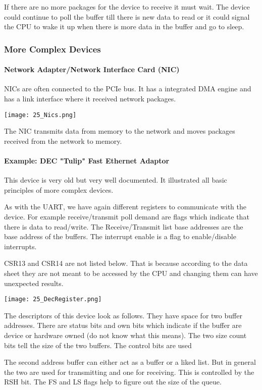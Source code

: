 If there are no more packages for the device to receive it must wait. The device could continue to poll the buffer till there is new data to read or it could signal the CPU to wake it up when there is more data in the buffer and go to sleep.

\subsubsection{More Complex Devices}
\paragraph{Network Adapter/Network Interface Card (NIC)}
NICs are often connected to the PCIe bus. It has a integrated DMA engine and has a link interface where it received network packages.

\texttt{[image: 25\_Nics.png]}

The NIC transmits data from memory to the network and moves packages received from the network to memory.

\paragraph{Example: DEC "Tulip" Fast Ethernet Adaptor}
This device is very old but  very well documented. It illustrated all basic principles of more complex devices.

As with the UART, we have again different registers to communicate with the device. For example receive/transmit poll demand are flags which indicate that there is data to read/write. The Receive/Transmit list base addresses are the base address of the buffers. The interrupt enable is a flag to enable/disable interrupts.

CSR13 and CSR14 are not listed below. That is because according to the data sheet they are not meant to be accessed by the CPU and changing them can have unexpected results.

\texttt{[image: 25\_DecRegister.png]}

The descriptors of this device look as follows. They have space for two buffer addresses. There are status bits and own bits which indicate if the buffer are device or hardware owned (do not know what this means). The two size count bits tell the size of the two buffers. The control bits are used 

The second address buffer can either act as a buffer or a liked list. But in general the two are used for transmitting and one for receiving. This is controlled by the RSH bit. The FS and LS flags help to figure out the size of the queue.

